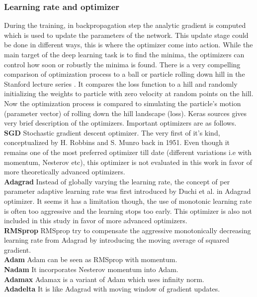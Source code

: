 \subsubsection{Learning rate and optimizer}
During the training, in backpropagation step the analytic gradient is computed which is used to update the parameters of the network. This update stage could be done in different ways, this is where the optimizer come
into action. While the main target of the deep learning task is to find the minima, the optimizers can control how soon or robustly the minima is found. There is a very compelling comparison of optimization process to 
a ball or particle rolling down hill in the Stanford lecture series \cite{cs231n}. It compares the loss function to a hill and randomly initializing the weights to particle with zero velocity at random points on the hill.
Now the optimization process is compared to simulating the particle's motion (parameter vector) of rolling down the hill landscape (loss).
Keras sources \cite{kerasopt} gives very brief description of the optimizers. Important optimizers are as follows.\\
\textbf{SGD} Stochastic gradient descent optimizer. The very first of it's kind, conceptualized by H. Robbins and S. Munro back in 1951. Even though it remains one of the most preferred optimizer till date 
(different variations i.e with momentum, Nesterov etc), this optimizer is not evaluated in this work in favor of more theoretically advanced optimizers. \\
\textbf{Adagrad} Instead of globally varying the learning rate, the concept of per parameter adaptive learning rate was first introduced by Duchi et al. in Adagrad optimizer. It seems it has a limitation though, 
the use of monotonic learning rate is often too aggressive and the learning stops too early. This optimizer is also not included in this study in favor of more advanced optimizers.\\
\textbf{RMSprop} RMSprop try to compensate the aggressive monotonically decreasing learning rate from Adagrad by introducing the moving average of squared gradient.\\
\textbf{Adam} Adam can be seen as RMSprop with momentum.\\
\textbf{Nadam} It incorporates Nesterov momentum into Adam.\\
\textbf{Adamax} Adamax is a variant of Adam which uses infinity norm.\\
\textbf{Adadelta} It is like Adagrad with moving window of gradient updates. \\

